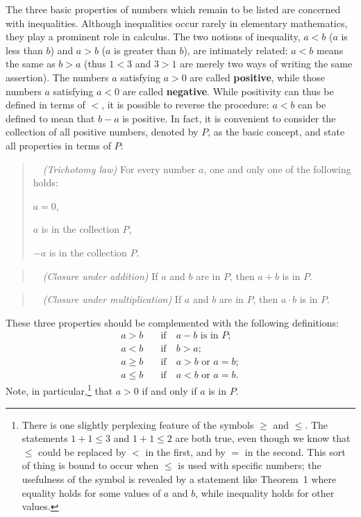 The three basic properties of numbers which remain to be listed are concerned
with inequalities. Although inequalities occur rarely in elementary
mathematics, they play a prominent role in calculus. The two notions of
inequality, $a<b$ ($a$ is less than $b$) and $a>b$ ($a$ is greater than $b$),
are intimately related: $a<b$ means the same as $b>a$ (thus $1<3$ and $3>1$
are merely two ways of writing the same assertion). The numbers $a$
satisfying $a>0$ are called \textbf{positive}, while those numbers $a$
satisfying $a<0$ are called \textbf{negative}. While positivity can thus be
defined in terms of $<$, it is possible to reverse the procedure: $a<b$ can
be defined to mean that $b-a$ is positive. In fact, it is convenient to
consider the collection of all positive numbers, denoted by $P$, as the basic
concept, and state all properties in terms of $P$:

\begin{quote}
\ \ \textit{(Trichotomy law)} For every number $a$, one and only
one of the following holds:
\begin{romans}
\item $a = 0$,
\item $a$ is in the collection $P$,
\item $-a$ is in the collection $P$.
\end{romans}
\end{quote}

\begin{quote}
\ \ \textit{(Closure under addition)} If $a$ and $b$ are in $P$,
then $a+b$ is in $P$.
\end{quote}

\begin{quote}
\ \ \textit{(Closure under multiplication)} If $a$ and $b$ are in
$P$, then $a \cdot b$ is in $P$.
\end{quote}

These three properties should be complemented with the following definitions:
\begin{align*}
a > b &\quad\text{if}\quad a - b \text{ is in } P;\\
a < b &\quad\text{if}\quad b > a;\\
a \geq b &\quad\text{if}\quad a > b \text{ or } a = b;\\
a \leq b &\quad\text{if}\quad a < b \text{ or } a = b.
\end{align*}
Note, in particular,\footnote{There is one slightly perplexing feature of
the symbols $\geq$ and $\leq$. The statements $1+1 \leq 3$ and $1+1 \leq 2$
are both true, even though we know that $\leq$ could be replaced by $<$ in
the first, and by $=$ in the second. This sort of thing is bound to occur
when $\leq$ is used with specific numbers; the usefulness of the symbol is
revealed by a statement like Theorem~1 where equality holds for some values
of $a$ and $b$, while inequality holds for other values.}
that $a>0$ if and only if $a$ is in $P$.

